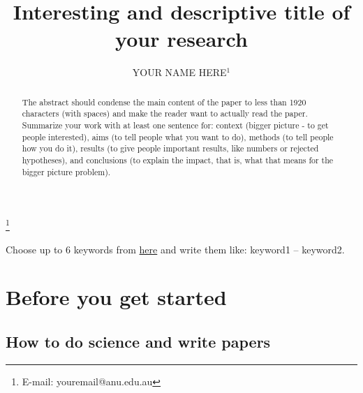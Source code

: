 \documentclass[twocolumn,apj,numberedappendix,appendixfloats]{openjournal}
\begin{document}
\title{Interesting and descriptive title of your research}

\author{\vspace{-1.5cm}YOUR NAME HERE$^{1}$}




\thanks{E-mail: youremail@anu.edu.au}

\begin{abstract}
The abstract should condense the main content of the paper to less than 1920 characters (with spaces) and make the reader want to actually read the paper. Summarize your work with at least one sentence for: context (bigger picture - to get people interested), aims (to tell people what you want to do), methods (to tell people how you do it), results (to give people important results, like numbers or rejected hypotheses), and conclusions (to explain the impact, that is, what that means for the bigger picture problem).
\end{abstract}

\begin{keywords}
    {Choose up to 6 keywords from \href{https://academic.oup.com/DocumentLibrary/mnras/keywords.pdf}{here} and write them like: keyword1 -- keyword2.}
\end{keywords}

\maketitle

\section{Before you get started}

\subsection{How to do science and write papers}
\end{document}
